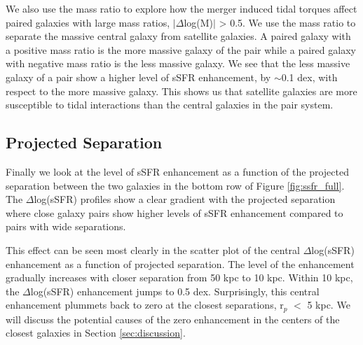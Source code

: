 \documentclass[iop,revtex4,twocolumn,apj,numberedappendix,appendixfloats]{emulateapj}
\begin{document}
We also use the mass ratio to explore how the merger induced tidal torques affect paired galaxies with large mass ratios, $|\Delta$log(M)$|$ > 0.5. We use the mass ratio to separate the massive central galaxy from satellite galaxies. A paired galaxy with a positive mass ratio is the more massive galaxy of the pair while a paired galaxy with negative mass ratio is the less massive galaxy. We see that the less massive galaxy of a pair show a higher level of sSFR enhancement, by $\sim$0.1 dex, with respect to the more massive galaxy. This shows us that satellite galaxies are more susceptible to tidal interactions than the central galaxies in the pair system. 

\subsection{Projected Separation}
Finally we look at the level of sSFR enhancement as a function of the projected separation between the two galaxies in the bottom row of Figure \ref{fig:ssfr_full}. The $\Delta$log(sSFR) profiles show a clear gradient with the projected separation where close galaxy pairs show higher levels of sSFR enhancement compared to pairs with wide separations. 

This effect can be seen most clearly in the scatter plot of the central $\Delta$log(sSFR) enhancement as a function of projected separation. The level of the enhancement gradually increases with closer separation from 50 kpc to 10 kpc. Within 10 kpc, the $\Delta$log(sSFR) enhancement jumps to 0.5 dex. Surprisingly, this central enhancement plummets back to zero at the closest separations, r$_p$ $<$ 5 kpc. We will discuss the potential causes of the zero enhancement in the centers of the closest galaxies in Section \ref{sec:discussion}.
\end{document}
